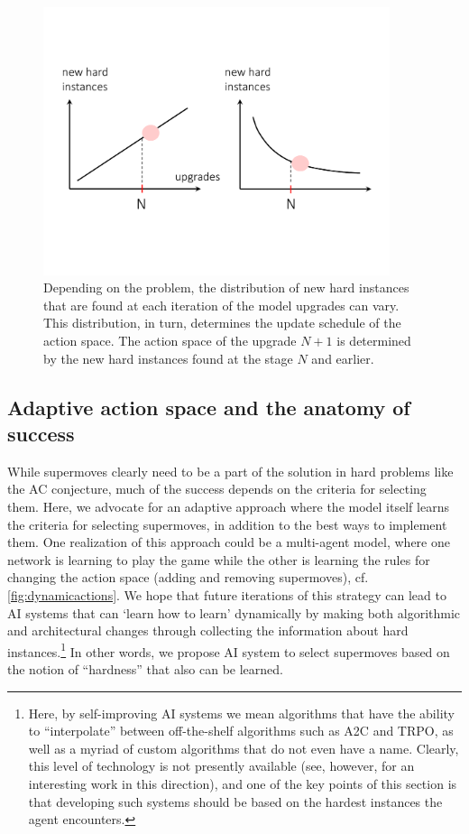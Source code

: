\begin{figure}[ht]
	\centering
	\includegraphics[trim={0.0in 2.0in 0.0in 1.5in},clip,width=4.0in]{fig/hardnesscurves2.pdf}
	\caption{Depending on the problem, the distribution of new hard instances that are found at each iteration of the model upgrades can vary. This distribution, in turn, determines the update schedule of the action space. The action space of the upgrade $N+1$ is determined by the new hard instances found at the stage $N$ and earlier.}
	\label{fig:hardnesscurves}
\end{figure}

\subsection{Adaptive action space and the anatomy of success}

While supermoves clearly need to be a part of the solution in hard problems like the AC conjecture, much of the success depends on the criteria for selecting them. Here, we advocate for an adaptive approach where the model itself learns the criteria for selecting supermoves, in addition to the best ways to implement them. One realization of this approach could be a multi-agent model, where one network is learning to play the game while the other is learning the rules for changing the action space (adding and removing supermoves), cf. \cref{fig:dynamicactions}. We hope that future iterations of this strategy can lead to AI systems that can `learn how to learn' dynamically by making both algorithmic and architectural changes through collecting the information about hard instances.\footnote{Here, by self-improving AI systems we mean algorithms that have the ability to ``interpolate'' between off-the-shelf algorithms such as A2C and TRPO, as well as a myriad of custom algorithms that do not even have a name. Clearly, this level of technology is not presently available (see, however, \cite{lu2022discovered} for an interesting work in this direction), and one of the key points of this section is that developing such systems should be based on the hardest instances the agent encounters.} In other words, we propose AI system to select supermoves based on the notion of ``hardness'' that also can be learned.

